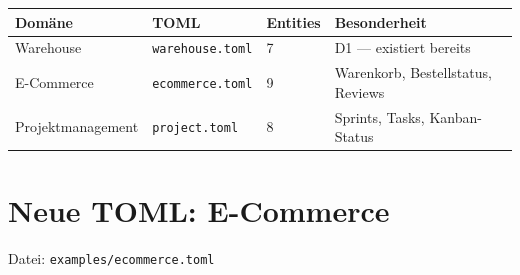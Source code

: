 \documentclass[11pt,a4paper]{article}
\begin{document}
\begin{center}
\begin{tabular}{l l l l}
\toprule
\textbf{Dom\"ane} & \textbf{TOML} & \textbf{Entities} & \textbf{Besonderheit} \\
\midrule
Warehouse & \texttt{warehouse.toml} & 7 & D1 --- existiert bereits \\
E-Commerce & \texttt{ecommerce.toml} & 9 & Warenkorb, Bestellstatus, Reviews \\
Projektmanagement & \texttt{project.toml} & 8 & Sprints, Tasks, Kanban-Status \\
\bottomrule
\end{tabular}
\end{center}

\section{Neue TOML: E-Commerce}

Datei: \texttt{examples/ecommerce.toml}
\end{document}
